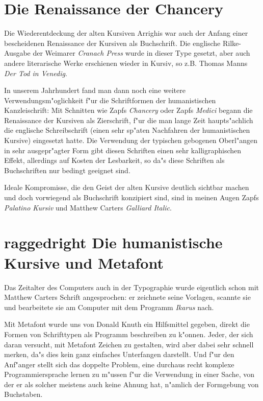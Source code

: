 \documentclass[draft,12pt,a4paper,german]{article}
\newcommand{\MF}{Metafont}
\begin{document}
\section{Die Renaissance der \glqq Chancery\grqq }

Die Wiederentdeckung der alten Kursiven Arrighis war auch der Anfang einer
bescheidenen Renaissance der Kursiven als Buchschrift. Die englische
Rilke-Ausgabe der Weimarer \emph{Cranach Press} wurde in dieser Type gesetzt,
aber auch andere literarische Werke erschienen wieder in Kursiv, so z.B.
Thomas Manns \emph{Der Tod in Venedig}.

In unserem Jahrhundert fand man dann noch eine weitere
Verwendungsm"oglichkeit f"ur die Schriftformen der humanistischen
Kanzleischrift: Mit Schnitten wie Zapfs \emph{Chancery} oder Zapfs {\em
Medici} begann die Renaissance der Kursiven als Zierschrift, f"ur die man
lange Zeit haupts"achlich die englische Schreibschrift (einen sehr sp"aten
Nachfahren der humanistischen Kursive) eingesetzt hatte. Die Verwendung der
typischen gebogenen Oberl"angen in sehr ausgepr"agter Form gibt diesen
Schriften einen sehr kalligraphischen Effekt, allerdings auf Kosten der
Lesbarkeit, so da"s diese Schriften als Buchschriften nur bedingt geeignet
sind.

Ideale Kompromisse, die den Geist der alten Kursive deutlich sichtbar machen
und doch vorwiegend als Buchschrift konzipiert sind, sind in meinen Augen
Zapfs \emph{Palatino Kursiv} und Matthew Carters \emph{Galliard Italic}.

\section{raggedright Die humanistische Kursive und \MF{}}

Das Zeitalter des Computers auch in der Typographie wurde eigentlich schon mit
Matthew Carters Schrift angesprochen: er zeichnete seine Vorlagen, scannte
sie und bearbeitete sie am Computer mit dem Programm \emph{Ikarus} nach.

Mit \MF{} wurde uns von Donald Knuth ein Hilfsmittel gegeben, direkt die
Formen von Schrifttypen als Programm beschreiben zu k"onnen. Jeder, der sich
daran versucht, mit \MF{} Zeichen zu gestalten, wird aber dabei sehr
schnell merken, da"s dies kein ganz einfaches Unterfangen darstellt. Und f"ur
den Anf"anger stellt sich das doppelte Problem, eine durchaus recht komplexe
Programmiersprache lernen zu m"ussen f"ur die Verwendung in einer Sache, von
der er als solcher meistens auch keine Ahnung hat, n"amlich der Formgebung
von Buchstaben.
\end{document}
